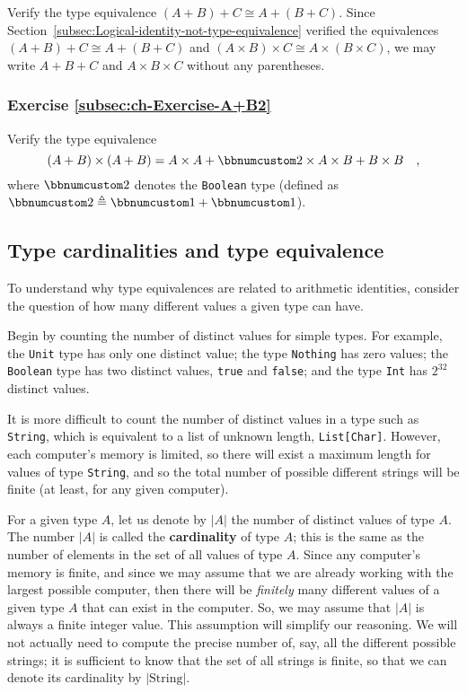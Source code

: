 Verify the type equivalence $\left(A+B\right)+C\cong A+\left(B+C\right)$.
Since Section~\ref{subsec:Logical-identity-not-type-equivalence}
verified the equivalences $\left(A+B\right)+C\cong A+\left(B+C\right)$
and $\left(A\times B\right)\times C\cong A\times\left(B\times C\right)$,
we may write $A+B+C$ and $A\times B\times C$ without any parentheses.

\subsubsection{Exercise \label{subsec:ch-Exercise-A+B2}\ref{subsec:ch-Exercise-A+B2}}

Verify the type equivalence 
\[
\left(A+B\right)\times\left(A+B\right)=A\times A+\bbnum 2\times A\times B+B\times B\quad,
\]
where $\bbnum 2$ denotes the \lstinline!Boolean! type (defined as
$\bbnum 2\triangleq\bbnum 1+\bbnum 1$).

\subsection{Type cardinalities and type equivalence}

To understand why type equivalences are related to arithmetic identities,
consider the question of how many different values a given type can
have.

Begin by counting the number of distinct values for simple types.
For example, the \lstinline!Unit! type has only one distinct value;
the type \lstinline!Nothing! has zero values; the \lstinline!Boolean!
type has two distinct values, \lstinline!true! and \lstinline!false!;
and the type \lstinline!Int! has $2^{32}$ distinct values.

It is more difficult to count the number of distinct values in a type
such as \lstinline!String!, which is equivalent to a list of unknown
length, \lstinline!List[Char]!. However, each computer\textsf{'}s memory is
limited, so there will exist a maximum length for values of type \lstinline!String!,
and so the total number of possible different strings will be finite
(at least, for any given computer).

For a given type $A$, let us denote by $\left|A\right|$ the number
of distinct values of type $A$. The number $\left|A\right|$ is called
the \textbf{cardinality} of type $A$; this is
the same as the number of elements in the set of all values of type
$A$. Since any computer\textsf{'}s memory is finite, and since we may assume
that we are already working with the largest possible computer, then
there will be \emph{finitely} many different values of a given type
$A$ that can exist in the computer. So, we may assume that $\left|A\right|$
is always a finite integer value. This assumption will simplify our
reasoning. We will not actually need to compute the precise number
of, say, all the different possible strings; it is sufficient to know
that the set of all strings is finite, so that we can denote its cardinality
by $|\text{String}|$.

